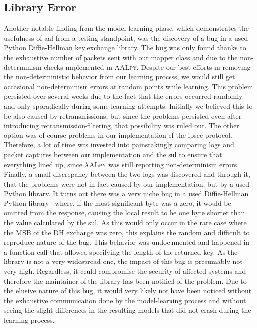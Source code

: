 \subsection{Library Error} \label{subsec:liberror}
Another notable finding from the model learning phase, which demonstrates the usefulness of \ac{aal} from a testing standpoint, was the discovery of a bug in a used Python Diffie-Hellman key exchange library. The bug was only found thanks to the exhaustive number of packets sent with our mapper class and due to the non-determinism checks implemented in \textsc{AALpy}. Despite our best efforts in removing the non-deterministic behavior from our learning process, we would still get occasional non-determinism errors at random points while learning. This problem persisted over several weeks due to the fact that the errors occurred randomly and only sporadically during some learning attempts. Initially we believed this to be also caused by retransmissions, but since the problems persisted even after introducing retransmission-filtering, that possibility was ruled out. The other option was of course problems in our implementation of the \ac{ipsec} protocol. Therefore, a lot of time was invested into painstakingly comparing logs and packet captures between our implementation and the \ac{sul} to ensure that everything lined up, since \textsc{AALpy} was still reporting non-determinism errors. Finally, a small discrepancy between the two logs was discovered and through it, that the problems were not in fact caused by our implementation, but by a used Python library. It turns out there was a very niche bug in a used Diffie-Hellman Python library~\cite{topdappdh} where, if the most significant byte was a zero, it would be omitted from the response, causing the local result to be one byte shorter than the value calculated by the \ac{sul}. As this would only occur in the rare case where the MSB of the DH exchange was zero, this explains the random and difficult to reproduce nature of the bug. This behavior was undocumented and happened in a function call that allowed specifying the length of the returned key. As the library is not a very widespread one, the impact of this bug is presumably not very high. Regardless, it could compromise the security of affected systems and therefore the maintainer of the library has been notified of the problem. Due to the elusive nature of this bug, it would very likely not have been noticed without the exhaustive communication done by the model-learning process and without seeing the slight differences in the resulting models that did not crash during the learning process.

